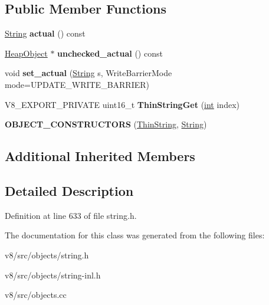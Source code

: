 \subsection*{Public Member Functions}
\begin{DoxyCompactItemize}
\item 
\mbox{\label{classv8_1_1internal_1_1ThinString_a790821a50cbe7688e11d7f4e7c52778e}} 
\mbox{\hyperlink{classv8_1_1internal_1_1String}{String}} {\bfseries actual} () const
\item 
\mbox{\label{classv8_1_1internal_1_1ThinString_a361dfde5036f0645e7e02e94e08db645}} 
\mbox{\hyperlink{classv8_1_1internal_1_1HeapObject}{Heap\+Object}} $\ast$ {\bfseries unchecked\+\_\+actual} () const
\item 
\mbox{\label{classv8_1_1internal_1_1ThinString_a66c04bcb8254372c4d2ab16211cd725f}} 
void {\bfseries set\+\_\+actual} (\mbox{\hyperlink{classv8_1_1internal_1_1String}{String}} s, Write\+Barrier\+Mode mode=U\+P\+D\+A\+T\+E\+\_\+\+W\+R\+I\+T\+E\+\_\+\+B\+A\+R\+R\+I\+ER)
\item 
\mbox{\label{classv8_1_1internal_1_1ThinString_a68447ebf6eb9b190ea85f4a2c3dbdf00}} 
V8\+\_\+\+E\+X\+P\+O\+R\+T\+\_\+\+P\+R\+I\+V\+A\+TE uint16\+\_\+t {\bfseries Thin\+String\+Get} (\mbox{\hyperlink{classint}{int}} index)
\item 
\mbox{\label{classv8_1_1internal_1_1ThinString_a2b697a8d02ea17c2c0d7347943e0b221}} 
{\bfseries O\+B\+J\+E\+C\+T\+\_\+\+C\+O\+N\+S\+T\+R\+U\+C\+T\+O\+RS} (\mbox{\hyperlink{classv8_1_1internal_1_1ThinString}{Thin\+String}}, \mbox{\hyperlink{classv8_1_1internal_1_1String}{String}})
\end{DoxyCompactItemize}
\subsection*{Additional Inherited Members}


\subsection{Detailed Description}


Definition at line 633 of file string.\+h.



The documentation for this class was generated from the following files\+:\begin{DoxyCompactItemize}
\item 
v8/src/objects/string.\+h\item 
v8/src/objects/string-\/inl.\+h\item 
v8/src/objects.\+cc\end{DoxyCompactItemize}
